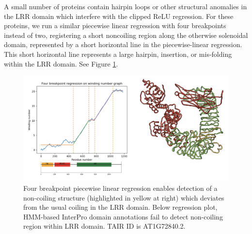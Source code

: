 \documentclass[authoryear]{article}
\begin{document}
 
A small number  of proteins contain hairpin loops or other structural anomalies in the LRR domain which interfere with the clipped ReLU regression. For these proteins, we run a similar piecewise linear regression with four breakpoints instead of two, registering a short noncoiling region along the otherwise solenoidal domain, represented by a short horizontal line in the piecewise-linear regression. This short horizontal line represents a large hairpin, insertion, or mis-folding within the LRR domain. See Figure \ref{fig:multibreakpt}.


\begin{figure}[h!]
 \centering
 \includegraphics[width=1.0\textwidth]{multi.png}
 \caption{Four breakpoint piecewise linear regression enables detection of a non-coiling structure (highlighted in yellow at right) which deviates from the usual coiling in the LRR domain. Below regression plot, HMM-based InterPro domain annotations fail to detect non-coiling region within LRR domain. TAIR ID is AT1G72840.2.}
 \label{fig:multibreakpt}
\end{figure}



 
\end{document}
